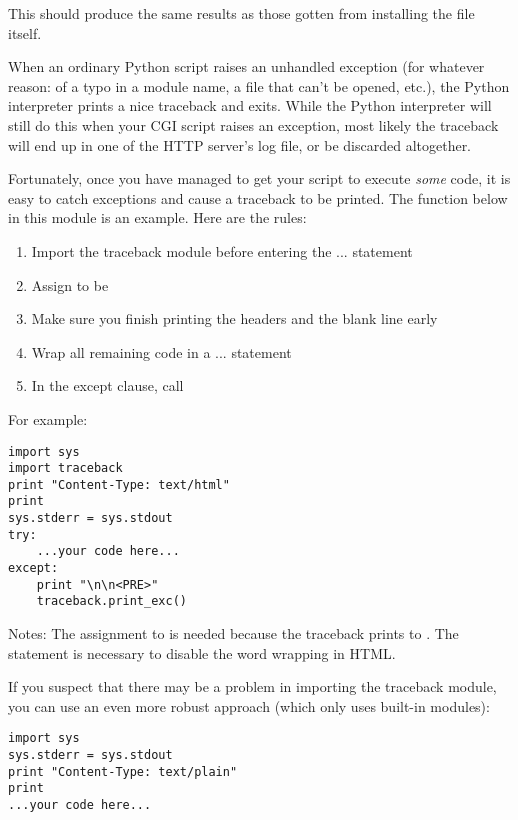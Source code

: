 This should produce the same results as those gotten from installing
the  file itself.

When an ordinary Python script raises an unhandled exception (for
whatever reason: of a typo in a module name, a file that can't be
opened, etc.), the Python interpreter prints a nice traceback and
exits.  While the Python interpreter will still do this when your CGI
script raises an exception, most likely the traceback will end up in
one of the HTTP server's log file, or be discarded altogether.

Fortunately, once you have managed to get your script to execute
\emph{some} code, it is easy to catch exceptions and cause a traceback
to be printed.  The  function below in this module is
an example.  Here are the rules:

\begin{enumerate}
\item Import the traceback module before entering the 
   ...  statement

\item Assign  to be 

\item Make sure you finish printing the headers and the blank line
   early

\item Wrap all remaining code in a  ... 
   statement

\item In the except clause, call 
\end{enumerate}

For example:

\begin{verbatim}
import sys
import traceback
print "Content-Type: text/html"
print
sys.stderr = sys.stdout
try:
    ...your code here...
except:
    print "\n\n<PRE>"
    traceback.print_exc()
\end{verbatim}

Notes: The assignment to  is needed because the
traceback prints to .
The  statement is necessary to
disable the word wrapping in HTML.

If you suspect that there may be a problem in importing the traceback
module, you can use an even more robust approach (which only uses
built-in modules):

\begin{verbatim}
import sys
sys.stderr = sys.stdout
print "Content-Type: text/plain"
print
...your code here...
\end{verbatim}

